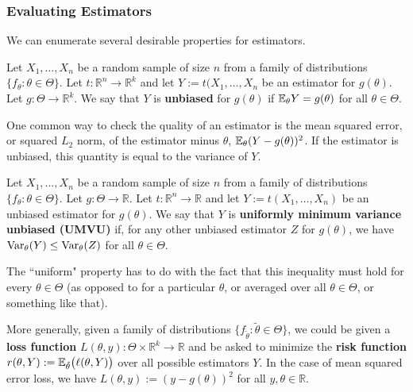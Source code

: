 \subsubsection{Evaluating Estimators}

We can enumerate several desirable properties for estimators.

\begin{definition}Let \(X_1, \ldots, X_n\) be a random sample of size \(n\) from a family of distributions \(\{f_\theta: \theta \in \Theta\}\). Let \(t: \mathbb{R}^n \to \mathbb{R}^k\) and let \(Y:= t(X_1, \ldots, X_n\) be an estimator for \(g(\theta)\). Let \(g:\Theta \to \mathbb{R}^k\). We say that \(Y\) is \textbf{unbiased} for \(g(\theta)\) if \(\E_\theta Y = g(\theta)\) for all \(\theta \in \Theta\).

\end{definition}

One common way to check the quality of an estimator is the mean squared error, or squared \(L_2\) norm, of the estimator minus \(\theta\), \(\E_\theta(Y- g(\theta))^2\). If the estimator is unbiased, this quantity is equal to the variance of \(Y\).

\begin{definition}Let \(X_1, \ldots, X_n\) be a random sample of size \(n\) from a family of distributions \(\{f_\theta: \theta \in \Theta\}\). Let \(g: \Theta \to \mathbb{R}\). Let \(t: \mathbb{R}^n \to \mathbb{R}\) and let \(Y:= t(X_1, \ldots, X_n)\) be an unbiased estimator for \(g(\theta)\). We say that \(Y\) is \textbf{uniformly minimum variance unbiased (UMVU)} if, for any other unbiased estimator \(Z\) for \(g(\theta)\), we have \(\Var_\theta(Y) \leq \Var_\theta(Z)\) for all \(\theta \in \Theta\).

\end{definition}

\begin{remark}The ``uniform" property has to do with the fact that this inequality must hold for every \(\theta \in \Theta\) (as opposed to for a particular \(\theta\), or averaged over all \(\theta \in \Theta\), or something like that).

\end{remark}

More generally, given a family of distributions \(\{f_{\tilde{\theta}}: \tilde{\theta} \in \Theta\}\), we could be given a \textbf{loss function} \(L(\theta, y): \Theta \times \mathbb{R}^k \to \mathbb{R}\) and be asked to minimize the \textbf{risk function} \(r(\theta, Y) := \E_{\tilde{\theta}} \big( \ell(\theta, Y) \big)  \) over all possible estimators \(Y\). In the case of mean squared error loss, we have \(L(\theta,y) := (y - g(\theta))^2\) for all \(y, \theta \in \mathbb{R}\).

